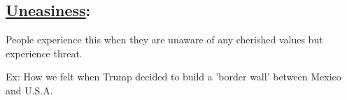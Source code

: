 \documentclass[11pt]{article}
\begin{document}
\subsection{\textbf{\underline{Uneasiness}}:}
\label{sec:orgbacf3cd}
People experience this when they are unaware of any cherished values but 
experience threat.

Ex: How we felt when Trump decided to build a 'border wall' between
Mexico and U.S.A.
\end{document}
